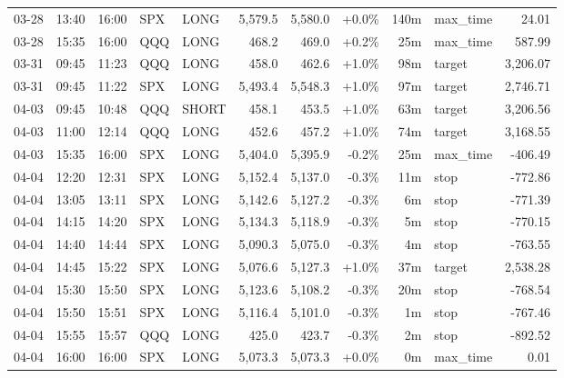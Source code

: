 \documentclass[11pt,a4paper,twoside]{article}
\begin{document}
\begin{center}
\begin{longtable}{>{\color{txtmain}}l l l l l r r r r >{\color{txtmain}}l r}
03-28 & 13:40 & 16:00 & SPX & LONG & 5,579.5 & 5,580.0 & \textcolor{wingreen}{+0.0\%} & 140m & max\_time & \textcolor{wingreen}{24.01} \\
03-28 & 15:35 & 16:00 & QQQ & LONG & 468.2 & 469.0 & \textcolor{wingreen}{+0.2\%} & 25m & max\_time & \textcolor{wingreen}{587.99} \\
03-31 & 09:45 & 11:23 & QQQ & LONG & 458.0 & 462.6 & \textcolor{wingreen}{+1.0\%} & 98m & target & \textcolor{wingreen}{3,206.07} \\
03-31 & 09:45 & 11:22 & SPX & LONG & 5,493.4 & 5,548.3 & \textcolor{wingreen}{+1.0\%} & 97m & target & \textcolor{wingreen}{2,746.71} \\
04-03 & 09:45 & 10:48 & QQQ & SHORT & 458.1 & 453.5 & \textcolor{wingreen}{+1.0\%} & 63m & target & \textcolor{wingreen}{3,206.56} \\
04-03 & 11:00 & 12:14 & QQQ & LONG & 452.6 & 457.2 & \textcolor{wingreen}{+1.0\%} & 74m & target & \textcolor{wingreen}{3,168.55} \\
04-03 & 15:35 & 16:00 & SPX & LONG & 5,404.0 & 5,395.9 & \textcolor{lossred}{-0.2\%} & 25m & max\_time & \textcolor{lossred}{-406.49} \\
04-04 & 12:20 & 12:31 & SPX & LONG & 5,152.4 & 5,137.0 & \textcolor{lossred}{-0.3\%} & 11m & stop & \textcolor{lossred}{-772.86} \\
04-04 & 13:05 & 13:11 & SPX & LONG & 5,142.6 & 5,127.2 & \textcolor{lossred}{-0.3\%} & 6m & stop & \textcolor{lossred}{-771.39} \\
04-04 & 14:15 & 14:20 & SPX & LONG & 5,134.3 & 5,118.9 & \textcolor{lossred}{-0.3\%} & 5m & stop & \textcolor{lossred}{-770.15} \\
04-04 & 14:40 & 14:44 & SPX & LONG & 5,090.3 & 5,075.0 & \textcolor{lossred}{-0.3\%} & 4m & stop & \textcolor{lossred}{-763.55} \\
04-04 & 14:45 & 15:22 & SPX & LONG & 5,076.6 & 5,127.3 & \textcolor{wingreen}{+1.0\%} & 37m & target & \textcolor{wingreen}{2,538.28} \\
04-04 & 15:30 & 15:50 & SPX & LONG & 5,123.6 & 5,108.2 & \textcolor{lossred}{-0.3\%} & 20m & stop & \textcolor{lossred}{-768.54} \\
04-04 & 15:50 & 15:51 & SPX & LONG & 5,116.4 & 5,101.0 & \textcolor{lossred}{-0.3\%} & 1m & stop & \textcolor{lossred}{-767.46} \\
04-04 & 15:55 & 15:57 & QQQ & LONG & 425.0 & 423.7 & \textcolor{lossred}{-0.3\%} & 2m & stop & \textcolor{lossred}{-892.52} \\
04-04 & 16:00 & 16:00 & SPX & LONG & 5,073.3 & 5,073.3 & \textcolor{wingreen}{+0.0\%} & 0m & max\_time & \textcolor{wingreen}{0.01} \\

\end{longtable}
\end{center}
\end{document}
